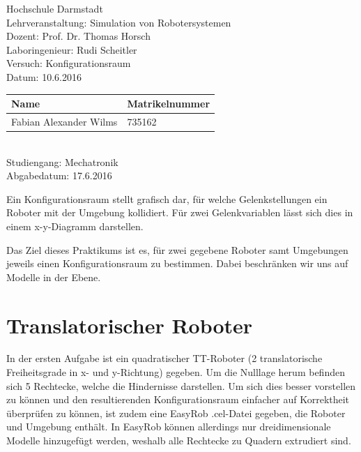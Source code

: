 \documentclass[11pt, a4paper]{article}
\date{\today}
\begin{document}
\begin{center}
{\Huge Hochschule Darmstadt} \\
\vspace{0.5cm}
Lehrveranstaltung: Simulation von Robotersystemen \\
Dozent: Prof. Dr. Thomas Horsch \\
Laboringenieur: Rudi Scheitler \\
Versuch: Konfigurationsraum\\
Datum: 10.6.2016 \\
\vfill
\renewcommand{\arraystretch}{2}
	\begin{tabular}{| l | l |}
	\hline
	Name & Matrikelnummer \\ \hline
	Fabian Alexander Wilms & 735162 \\ \hline
	\end{tabular} \\
\vspace{0.5cm}
Studiengang: Mechatronik \\
Abgabedatum: 17.6.2016 \\
\renewcommand{\arraystretch}{1}
\end{center}
\newpage
\tableofcontents
\newpage
Ein Konfigurationsraum stellt grafisch dar, für welche Gelenkstellungen ein Roboter mit der Umgebung kollidiert. Für zwei Gelenkvariablen lässt sich dies in einem x-y-Diagramm darstellen.

Das Ziel dieses Praktikums ist es, für zwei gegebene Roboter samt Umgebungen jeweils einen Konfigurationsraum zu bestimmen. Dabei beschränken wir uns auf Modelle in der Ebene.

\section{Translatorischer Roboter}
In der ersten Aufgabe ist ein quadratischer TT-Roboter (2 translatorische Freiheitsgrade in x- und y-Richtung) gegeben. Um die Nulllage herum befinden sich 5 Rechtecke, welche die Hindernisse darstellen. Um sich dies besser vorstellen zu können und den resultierenden Konfigurationsraum einfacher auf Korrektheit überprüfen zu können, ist zudem eine EasyRob .cel-Datei gegeben, die Roboter und Umgebung enthält. In EasyRob können allerdings nur dreidimensionale Modelle hinzugefügt werden, weshalb alle Rechtecke zu Quadern extrudiert sind.
\end{document}
